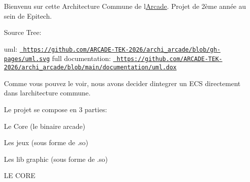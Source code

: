 Bienvenu sur cette Architecture Commune de l\textquotesingle{}\mbox{\hyperlink{a00060}{Arcade}}. Projet de 2ème année au sein de Epitech.

Source Tree\+: 
\begin{DoxyCode}{0}
\DoxyCodeLine{}

\end{DoxyCode}
 uml\+: \href{https://github.com/ARCADE-TEK-2026/archi_arcade/blob/gh-pages/uml.svg}{\texttt{ https\+://github.\+com/\+ARCADE-\/\+TEK-\/2026/archi\+\_\+arcade/blob/gh-\/pages/uml.\+svg}} full documentation\+: \href{https://github.com/ARCADE-TEK-2026/archi_arcade/blob/main/documentation/uml.dox}{\texttt{ https\+://github.\+com/\+ARCADE-\/\+TEK-\/2026/archi\+\_\+arcade/blob/main/documentation/uml.\+dox}}

Comme vous pouvez le voir, nous avons decider d\textquotesingle{}integrer un ECS directement dans l\textquotesingle{}architecture commune.

Le projet se compose en 3 parties\+:
\begin{DoxyItemize}
\item Le Core (le binaire arcade)
\item Les jeux (sous forme de .so)
\item Les lib graphic (sous forme de .so)
\end{DoxyItemize}

 LE CORE

